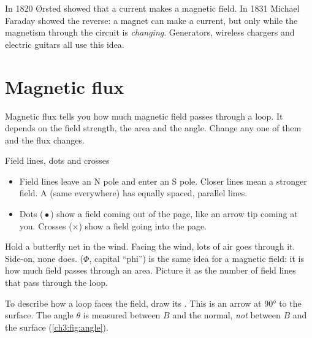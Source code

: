 In 1820 Ørsted showed that a current makes a magnetic field. In 1831 Michael
Faraday showed the reverse: a magnet can make a current, but only while the
magnetism through the circuit is \emph{changing}. Generators, wireless chargers
and electric guitars all use this idea.

\section{Magnetic flux}\label{ch3:sec:flux}

\begin{bigidea}
Magnetic flux tells you how much magnetic field passes through a loop. It
depends on the field strength, the area and the angle. Change any one of them
and the flux changes.
\end{bigidea}

\begin{keywords}
\end{keywords}

\begin{refresher}{Field lines, dots and crosses}
\begin{itemize}
  \item Field lines leave an N pole and enter an S pole. Closer lines mean a
        stronger field. A  (same everywhere) has equally
        spaced, parallel lines.
  \item Dots (\,$\bullet$\,) show a field coming out of the page, like an arrow tip
        coming at you. Crosses ($\times$) show a field going into the page.
\end{itemize}
\end{refresher}

Hold a butterfly net in the wind. Facing the wind, lots of air goes through it.
Side-on, none does.  ($\Phi$, capital ``phi'') is the same idea
for a magnetic field: it is how much field passes through an area. Picture it as
the number of field lines that pass through the loop.

To describe how a loop faces the field, draw its . This is an arrow at
\ang{90} to the surface. The angle $\theta$ is measured between $B$ and the normal,
\emph{not} between $B$ and the surface (\cref{ch3:fig:angle}).

